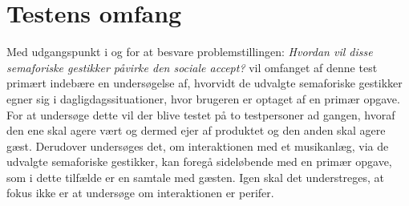 \section{Testens omfang}
\label{TestensOmfangSocialAccept}
%
Med udgangspunkt i og for at besvare problemstillingen: \textit{Hvordan vil disse semaforiske gestikker påvirke den sociale accept?} vil omfanget af denne test primært indebære en undersøgelse af, hvorvidt de udvalgte semaforiske gestikker egner sig i dagligdagssituationer, hvor brugeren er optaget af en primær opgave. For at undersøge dette vil der blive testet på to testpersoner ad gangen, hvoraf den ene skal agere vært og dermed ejer af produktet og den anden skal agere gæst. Derudover undersøges det, om interaktionen med et musikanlæg, via de udvalgte semaforiske gestikker, kan foregå sideløbende med en primær opgave, som i dette tilfælde er en samtale med gæsten. Igen skal det understreges, at fokus ikke er at undersøge om interaktionen er perifer. 


